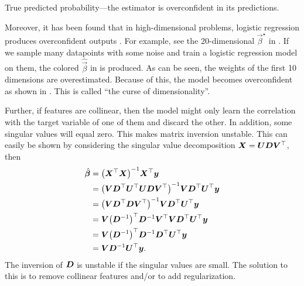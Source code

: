 \begin{marginfigure}
    \caption{True \vs predicted probability---the estimator is overconfident in its predictions.}
    \label{fig:overconfidence}
\end{marginfigure}

Moreover, it has been found that in high-dimensional problems, logistic regression produces
overconfident outputs \citep{sur2019modern}. For example, see the 20-dimensional
$\vec{\beta}^\star$ in . If we sample many datapoints with some noise and
train a logistic regression model on them, the colored $\hat{\vec{\beta}}$ in
 is produced. As can be seen, the weights of the first 10 dimensions are
overestimated. Because of this, the model becomes overconfident as shown in
. This is called ``the curse of dimensionality''.

Further, if features are collinear, then the model might only learn the correlation with the target
variable of one of them and discard the other. In addition, some singular values will equal zero.
This makes matrix inversion unstable. This can easily be shown by considering the singular value
decomposition $\bm{X} = \bm{U} \bm{D} \bm{V}^\top$, then
\begin{align*}
    \hat{\vec{\beta}} & = \inv{\lft( \transpose{\mat{X}} \mat{X} \rgt)} \transpose{\mat{X}} \vec{y}                                                                                     \\
                      & = \inv{\lft( \mat{V} \transpose{\mat{D}} \transpose{\mat{U}} \mat{U} \mat{D} \transpose{\mat{V}} \rgt)} \mat{V} \transpose{\mat{D}} \transpose{\mat{U}} \vec{y} \\
                      & = \inv{\lft( \mat{V} \transpose{\mat{D}} \mat{D} \transpose{\mat{V}} \rgt)} \mat{V} \transpose{\mat{D}} \transpose{\mat{U}} \vec{y}                             \\
                      & = \mat{V} \transpose{\lft( \inv{\mat{D}} \rgt)} \inv{\mat{D}} \transpose{\mat{V}} \mat{V} \transpose{\mat{D}} \transpose{\mat{U}} \vec{y}                       \\
                      & = \mat{V} \transpose{\lft( \inv{\mat{D}} \rgt)} \inv{\mat{D}} \transpose{\mat{D}} \transpose{\mat{U}} \vec{y}                                                   \\
                      & = \mat{V} \inv{\mat{D}} \transpose{\mat{U}} \vec{y}.
\end{align*}
The inversion of $\bm{D}$ is unstable if the singular values are small. The solution to this is to
remove collinear features and/or to add regularization.

